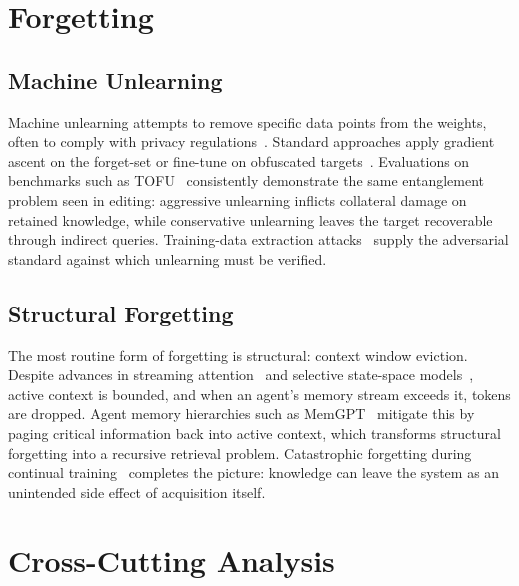 \documentclass{article}
\begin{document}
\section{Forgetting}
\label{sec:forgetting}

\subsection{Machine Unlearning}

Machine unlearning attempts to remove specific data points from the weights, often to comply with privacy regulations~\citep{jang2023unlearning}. Standard approaches apply gradient ascent on the forget-set or fine-tune on obfuscated targets~\citep{eldan2023harrypotter}. Evaluations on benchmarks such as TOFU~\citep{maini2024tofu} consistently demonstrate the same entanglement problem seen in editing: aggressive unlearning inflicts collateral damage on retained knowledge, while conservative unlearning leaves the target recoverable through indirect queries. Training-data extraction attacks~\citep{carlini2021extraction} supply the adversarial standard against which unlearning must be verified.

\subsection{Structural Forgetting}

The most routine form of forgetting is structural: context window eviction. Despite advances in streaming attention~\citep{xiao2024streamingllm} and selective state-space models~\citep{gu2023mamba}, active context is bounded, and when an agent's memory stream exceeds it, tokens are dropped. Agent memory hierarchies such as MemGPT~\citep{packer2023memgpt} mitigate this by paging critical information back into active context, which transforms structural forgetting into a recursive retrieval problem. Catastrophic forgetting during continual training~\citep{kirkpatrick2017ewc, luo2024catastrophic} completes the picture: knowledge can leave the system as an unintended side effect of acquisition itself.

\section{Cross-Cutting Analysis}
\label{sec:analysis}
\end{document}
